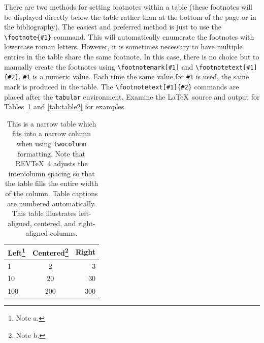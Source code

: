 \documentclass[aps,prl,twocolumn,superscriptaddress,groupedaddress]{revtex4}  %
\begin{document}
There are two methods for setting footnotes within a table (these
footnotes will be displayed directly below the table rather than at
the bottom of the page or in the bibliography). The easiest
and preferred method is just to use the \verb+\footnote{#1}+
command. This will automatically enumerate the footnotes with
lowercase roman letters. However, it is sometimes necessary to have
multiple entries in the table share the same footnote. In this case,
there is no choice but to manually create the footnotes using
\verb+\footnotemark[#1]+ and \verb+\footnotetext[#1]{#2}+.
\texttt{\#1} is a numeric value. Each time the same value for
\texttt{\#1} is used, the same mark is produced in the table. The
\verb+\footnotetext[#1]{#2}+ commands are placed after the \texttt{tabular}
environment. Examine the \LaTeX\ source and output for
Tables~\ref{tab:table1} and \ref{tab:table2} for examples.

\begin{table}[t]
\caption{\label{tab:table1}This is a narrow table which fits into a
narrow column when using \texttt{twocolumn} formatting. Note that
REV\TeX~4 adjusts the intercolumn spacing so that the table fills the
entire width of the column. Table captions are numbered
automatically. This table illustrates left-aligned, centered, and
right-aligned columns.  }
\begin{ruledtabular}
\begin{tabular}{lcr}
Left\footnote{Note a.}&Centered\footnote{Note b.}&Right\\
\hline
1 & 2 & 3\\
10 & 20 & 30\\
100 & 200 & 300\\
\end{tabular}
\end{ruledtabular}
\end{table}
\end{document}
